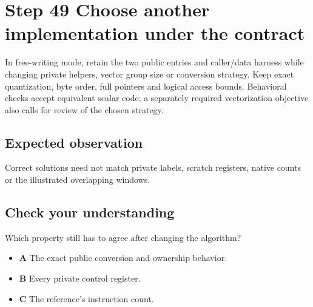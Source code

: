 \section{Step 49 Choose another implementation under the contract}\label{rgb-s49}

In free-writing mode, retain the two public entries and caller/data harness while changing private helpers, vector group size or conversion strategy. Keep exact quantization, byte order, full pointers and logical access bounds. Behavioral checks accept equivalent scalar code; a separately required vectorization objective also calls for review of the chosen strategy.

\subsection{Expected observation}
Correct solutions need not match private labels, scratch registers, native counts or the illustrated overlapping windows.

\subsection{Check your understanding}
Which property still has to agree after changing the algorithm?

\begin{itemize}
  \item \textbf{A} The exact public conversion and ownership behavior.
  \item \textbf{B} Every private control register.
  \item \textbf{C} The reference's instruction count.
\end{itemize}
